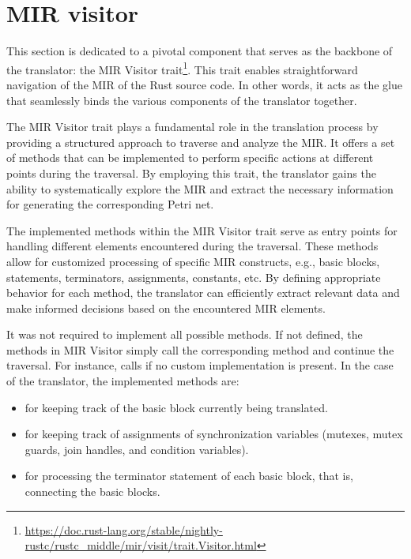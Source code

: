 \section{MIR visitor}

This section is dedicated to a pivotal component that serves as the backbone of the translator:
the \acrshort{MIR} Visitor trait\footnote{\url{https://doc.rust-lang.org/stable/nightly-rustc/rustc_middle/mir/visit/trait.Visitor.html}}.
This trait enables straightforward navigation of the \acrshort{MIR} of the Rust source code.
In other words, it acts as the glue that seamlessly binds the various components of the translator together.

The \acrshort{MIR} Visitor trait plays a fundamental role in the translation process
by providing a structured approach to traverse and analyze the \acrshort{MIR}.
It offers a set of methods that can be implemented to perform specific actions
at different points during the traversal.
By employing this trait,
the translator gains the ability to systematically explore the \acrshort{MIR}
and extract the necessary information for generating the corresponding Petri net.

The implemented methods within the \acrshort{MIR} Visitor trait serve
as entry points for handling different elements encountered during the traversal.
These methods allow for customized processing of specific \acrshort{MIR} constructs,
e.g., basic blocks, statements, terminators, assignments, constants, etc.
By defining appropriate behavior for each method,
the translator can efficiently extract relevant data and
make informed decisions based on the encountered \acrshort{MIR} elements.

It was not required to implement all possible methods.
If not defined, the methods in \acrshort{MIR} Visitor simply call
the corresponding  method and continue the traversal.
For instance,  calls
 if no custom implementation is present.
In the case of the translator, the implemented methods are:

\begin{itemize}
  \item {} for keeping track of the basic block currently being translated.
  \item {} for keeping track of assignments of synchronization variables
        (mutexes, mutex guards, join handles, and condition variables).
  \item {} for processing the terminator statement of each basic block,
        that is, connecting the basic blocks.
\end{itemize}

